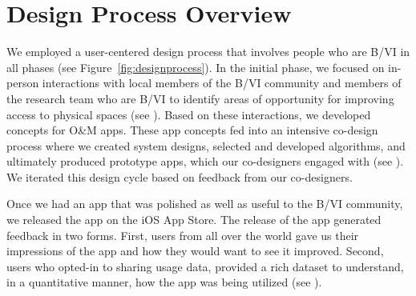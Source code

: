 \documentclass[chi_draft]{sigchi}
\newcommand{\BVI}{B/VI\xspace}
\newcommand{\OM}{O\&M\xspace}
\begin{document}

\section{Design Process Overview}

We employed a user-centered design process that involves people who are \BVI in all phases (see Figure~\ref{fig:designprocess}).  In the initial phase, we focused on in-person interactions with local members of the \BVI community and members of the research team who are \BVI to identify areas of opportunity for improving access to physical spaces (see \emph{}).  Based on these interactions, we developed concepts for \OM apps.  These app concepts fed into an intensive co-design process where we created system designs, selected and developed algorithms, and ultimately produced prototype apps, which our co-designers engaged with (see \emph{}).  We iterated this design cycle based on feedback from our co-designers.

Once we had an app that was polished as well as useful to the \BVI community, we released the app on the iOS App Store.  The release of the app generated feedback in two forms.  First, users from all over the world gave us their impressions of the app and how they would want to see it improved.  Second, users who opted-in to sharing usage data, provided a rich dataset to understand, in a quantitative manner, how the app was being utilized (see \emph{}).
\end{document}
